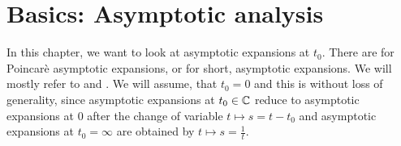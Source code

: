 \chapter{Basics: Asymptotic analysis}
\begin{comment}
  \begin{multicols}{2}
    ´classical'
    \begin{itemize}
      \item \cite[60]{sabbah_cimpa90} Chapter II.2.2
        \begin{itemize}
          \item \cite{sabbah2000equations}
        \end{itemize}
      \item \textbf{\textcolor{blue}{Van der Put:
            \cite[Chapter 7]{van2003galois}: Exact Asymptotics}}
      \item \cite{majima1984asymptotic}
      \item \cite[Sec.4.4]{Balser2000Formal}
      \item \cite{Loday1994}
      \item \textbf{\textcolor{blue}{\cite{Loday2014} Chapter 2}}
    \end{itemize}
    \columnbreak
    ´sheafical'
    \begin{itemize}
      \item \textbf{\textcolor{red}{\cite[II.5]{sabbah2007isomonodromic}}}
    \end{itemize}
  \end{multicols}
  \TODO[\cite{sibuya1990Linear} Appendix A.3]
\end{comment}
In this chapter, we want to look at asymptotic expansions at $t_0$.
There are  for Poincarè asymptotic
expansions, or for short, asymptotic expansions.
We will mostly refer to \cite[chapter 2]{Loday2014} and
\cite[chapter 7]{van2003galois}.
We will assume, that $t_0=0$ and this is without loss of generality, since
asymptotic expansions at $t_0\in\mathbb{C}$ reduce to asymptotic expansions at $0$
after the change of variable $t\mapsto s=t-t_0$ and asymptotic expansions at
$t_0=\infty$ are obtained by $t\mapsto s=\frac{1}{t}$.


